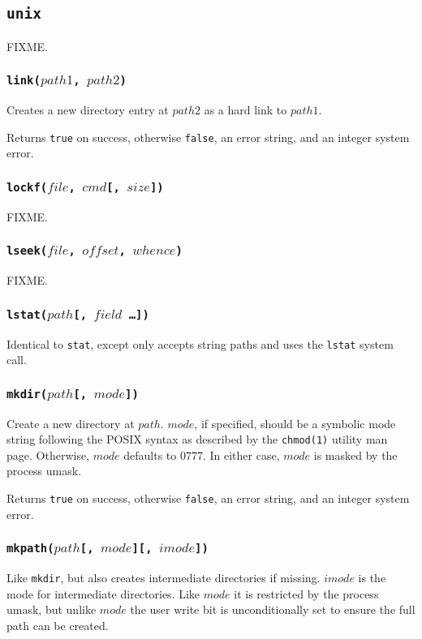 \documentclass[11pt, oneside]{memoir}
\newcommand*{\true}[0]{\texttt{true}\xspace}
\newcommand*{\false}[0]{\texttt{false}\xspace}
\newcommand*{\syscall}[1]{\texttt{#1}\xspace}
\newcommand*{\fn}[1]{\texttt{#1}\xspace}
\newcounter{toccols}
\newenvironment{Module}[1]{
	\subsection{\texttt{#1}}
	\addtocontents{toc}{
		\protect\begin{multicols}{\value{toccols}}
	}
}{
	\addtocontents{toc}{\protect\end{multicols}}
}
\begin{document}
\begin{Module}{unix}
FIXME.

\subsubsection[\fn{link}]{\fn{link($path1$, $path2$)}}

Creates a new directory entry at $path2$ as a hard link to $path1$.

Returns \true on success, otherwise \false, an error string, and an integer system error. 

\subsubsection[\fn{lockf}]{\fn{lockf($file$, $cmd$[, $size$])}}

FIXME.

\subsubsection[\fn{lseek}]{\fn{lseek($file$, $offset$, $whence$)}}

FIXME.

\subsubsection[\fn{lstat}]{\fn{lstat($path$[, $field$ \ldots])}}

Identical to \fn{stat}, except only accepts string paths and uses the \syscall{lstat} system call.

\subsubsection[\fn{mkdir}]{\fn{mkdir($path$[, $mode$])}}

Create a new directory at $path$. $mode$, if specified, should be a symbolic mode string following the POSIX syntax as described by the \texttt{chmod(1)} utility man page. Otherwise, $mode$ defaults to 0777. In either case, $mode$ is masked by the process umask.

Returns \true on success, otherwise \false, an error string, and an integer system error.

\subsubsection[\fn{mkpath}]{\fn{mkpath($path$[, $mode$][, $imode$])}}

Like \fn{mkdir}, but also creates intermediate directories if missing. $imode$ is the mode for intermediate directories. Like $mode$ it is restricted by the process umask, but unlike $mode$ the user write bit is unconditionally set to ensure the full path can be created.


\end{Module}
\end{document}
